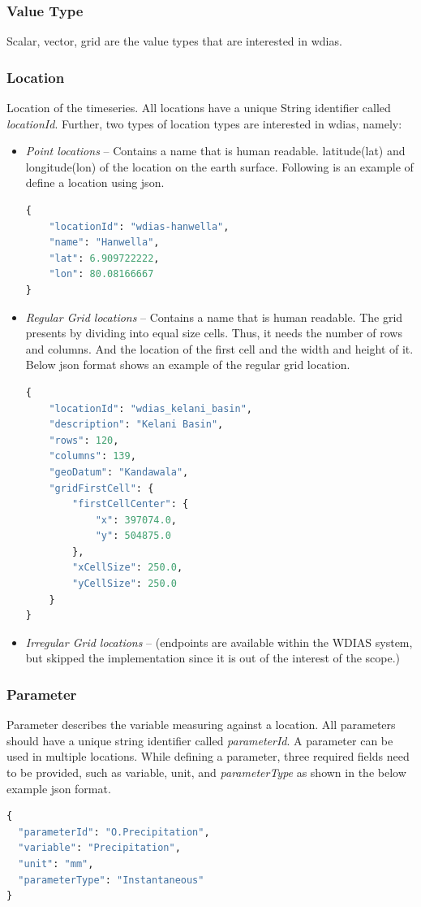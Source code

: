 \subsubsection{Value Type}
Scalar, vector, grid are the value types that are interested in \acrshort{wdias}.

\subsubsection{Location}
Location of the timeseries. All locations have a unique String identifier called \emph{locationId}. Further, two types of location types are interested in \acrshort{wdias}, namely:
\begin{itemize}
  \item \emph{Point locations} -- Contains a name that is human readable. latitude(lat) and longitude(lon) of the location on the earth surface. Following is an example of define a location using \acrfull{json}.
\begin{lstlisting}[language=Python]
{
    "locationId": "wdias-hanwella",
    "name": "Hanwella",
    "lat": 6.909722222,
    "lon": 80.08166667
}
\end{lstlisting}
  \item \emph{Regular Grid locations} -- Contains a name that is human readable. The grid presents by dividing into equal size cells. Thus, it needs the number of rows and columns. 
  And the location of the first cell and the width and height of it. Below \acrshort{json} format shows an example of the regular grid location. 
\begin{lstlisting}[language=Python]
{
    "locationId": "wdias_kelani_basin",
    "description": "Kelani Basin",
    "rows": 120,
    "columns": 139,
    "geoDatum": "Kandawala",
    "gridFirstCell": {
        "firstCellCenter": {
            "x": 397074.0,
            "y": 504875.0
        },
        "xCellSize": 250.0,
        "yCellSize": 250.0
    }
}
\end{lstlisting}
  \item \emph{Irregular Grid locations} -- (endpoints are available within the WDIAS system, but skipped the implementation since it is out of the interest of the scope.)
\end{itemize}

\subsubsection{Parameter}
Parameter describes the variable measuring against a location. All parameters should have a unique string identifier called \emph{parameterId}. A parameter can be used in multiple locations. While defining a parameter, three required fields need to be provided, such as variable, unit, and \emph{parameterType} as shown in the below example \acrshort{json} format.
\begin{lstlisting}[language=Python]
{
  "parameterId": "O.Precipitation",
  "variable": "Precipitation",
  "unit": "mm",
  "parameterType": "Instantaneous"
}
\end{lstlisting}

